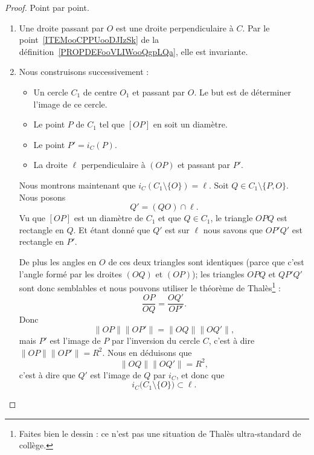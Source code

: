 \begin{proof}
    Point par point.
    \begin{enumerate}
        \item
            Une droite passant par \( O\) est une droite perpendiculaire à \( C\). Par le point~\ref{ITEMooCPPUooDJIzSk} de la définition~\ref{PROPDEFooVLIWooQgpLQa}, elle est invariante.
        \item
            Nous construisons successivement :
            \begin{itemize}
                \item
                    Un cercle \( C_1\) de centre \( O_1\) et passant par \( O\). Le but est de déterminer l'image de ce cercle.
                \item
                    Le point \( P\) de \( C_1\) tel que \( [OP]\) en soit un diamètre.
                \item
                    Le point \( P'=i_C(P)\).
                \item
                    La droite \( \ell\) perpendiculaire à \( (OP)\) et passant par \( P'\).
            \end{itemize}
            Nous montrons maintenant que \( i_C(C_1\setminus\{ O \})=\ell\). Soit \( Q\in C_1\setminus\{ P,O \}\). Nous posons
            \begin{equation}
                Q'=(QO)\cap \ell.
            \end{equation}
            Vu que \( [OP]\) est un diamètre de \( C_1\) et que \( Q\in C_1\), le triangle \( OPQ\) est rectangle en \( Q\). Et étant donné que \( Q'\) est sur \( \ell\) nous savons que \( OP'Q'\) est rectangle en \( P'\).

            De plus les angles en \( O\) de ces deux triangles sont identiques (parce que c'est l'angle formé par les droites \( (OQ) \) et \( (OP)\)); les triangles \( OPQ\) et \( QP'Q'\) sont donc semblables et nous pouvons utiliser le théorème de Thalès\footnote{Faites bien le dessin : ce n'est pas une situation de Thalès ultra-standard de collège.} :
            \begin{equation}
                \frac{ OP }{ OQ }=\frac{ OQ' }{ OP' }.
            \end{equation}
            Donc
            \begin{equation}
                \| OP \|\| OP' \|=\| OQ \|\| OQ' \|,
            \end{equation}
            mais \( P'\) est l'image de \( P\) par l'inversion du cercle \( C\), c'est à dire \( \| OP \|\| OP' \|=R^2\). Nous en déduisons que
            \begin{equation}
                \| OQ \| \| OQ' \|=R^2,
            \end{equation}
            c'est à dire que \( Q'\) est l'image de \( Q\) par \( i_C\), et donc que
            \begin{equation}        \label{EQooPJBGooGeIVQQ}
                i_C\big( C_1\setminus\{ O \} \big)\subset \ell.
            \end{equation}


\end{enumerate}
\end{proof}
